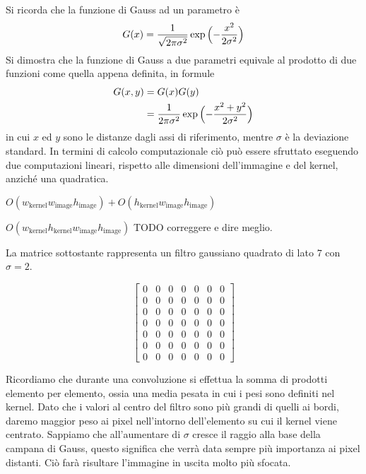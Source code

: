 Si ricorda che la funzione di Gauss ad un parametro è
\begin{equation*}
  G(x) = \frac{1}{\sqrt{2\pi\sigma^2}}
         \exp{\Bigl(- \frac{ x^2 }{ 2 \sigma^2 } \Bigr)} 
\end{equation*}
Si dimostra che la funzione di Gauss a due parametri equivale al prodotto di due funzioni come quella appena definita, in formule
\begin{equation}
  \begin{split}
    G(x,y) & = G(x)G(y) \\
           & = \frac{1}{2\pi\sigma^2}
               \exp{\Bigl(- \frac{ x^2 + y^2 }{ 2 \sigma^2 } \Bigr)} 
  \end{split}
\end{equation}
in cui $x$ ed $y$ sono le distanze dagli assi di riferimento, mentre $\sigma$ è la deviazione standard.
In termini di calcolo computazionale ciò può essere sfruttato eseguendo due computazioni lineari,
rispetto alle dimensioni dell'immagine e del kernel, %
anziché una quadratica.

$
{\displaystyle O\left(w_{\text{kernel}}w_{\text{image}}h_{\text{image}}\right)+O\left(h_{\text{kernel}}w_{\text{image}}h_{\text{image}}\right)}
$

$
{\displaystyle O\left(w_{\text{kernel}}h_{\text{kernel}}w_{\text{image}}h_{\text{image}}\right)}
$
TODO correggere e dire meglio.


La matrice sottostante rappresenta un filtro gaussiano quadrato di lato $7$ con $\sigma = 2$.

\begin{equation*} %
  \begin{bmatrix}
    0&0&0&0&0&0&0\\
    0&0&0&0&0&0&0\\
    0&0&0&0&0&0&0\\
    0&0&0&0&0&0&0\\
    0&0&0&0&0&0&0\\
    0&0&0&0&0&0&0\\
    0&0&0&0&0&0&0
  \end{bmatrix}
\end{equation*}

Ricordiamo che durante una convoluzione si effettua la somma di prodotti elemento per elemento, ossia una media pesata in cui i pesi sono definiti nel kernel.
Dato che i valori al centro del filtro sono più grandi di quelli ai bordi, daremo maggior peso ai pixel nell'intorno dell'elemento su cui il kernel viene centrato.
Sappiamo che all'aumentare di $\sigma$ cresce il raggio alla base della campana di Gauss, questo significa che verrà data sempre più importanza ai pixel distanti.
Ciò farà risultare l'immagine in uscita molto più sfocata.

